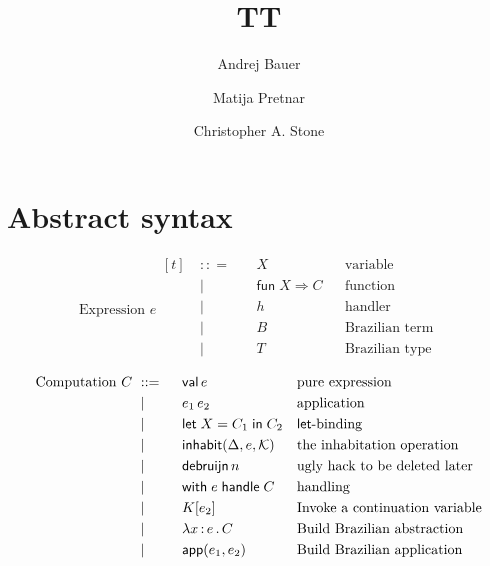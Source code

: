 \documentclass[11pt]{article}
\newcommand{\bnf}{\ \mathrel{{:}{:}{=}}\ }
\newcommand{\bnfor}{\ \mid\ \ }
\newcommand{\x}{x}     %
\newcommand{\C}{C}     %
\newcommand{\K}{K}     %
\newcommand{\X}{X}     %
\newcommand{\e}{e}     %
\newcommand{\rgn}{r}   %
\newcommand{\T}{T}     %
\newcommand{\val}{\mathsf{val}\,} %
\newcommand{\letin}[1]{\mathsf{let}\; #1 \;\mathsf{in}\;} %
\newcommand{\inhabit}[3]{\mathsf{inhabit}(#1, #2, #3)} %
\newcommand{\withhandle}[1]{\mathsf{with}\;#1\;\mathsf{handle}\;} %
\newcommand{\abs}[1]{\mathsf{abs}\;#1\;\mathsf{in}\;} %
\newcommand{\new}[2]{\mathsf{new}(#1,#2)} %
\newcommand{\fun}[1]{\mathsf{fun}\;#1\Rightarrow} %
\newcommand{\app}[2]{#1\,#2} %
\newcommand{\lam}[2]{\lambda #1 \,{:}\, #2 \,.\,} %
\newcommand{\kapp}[2]{#1[#2]} %
\newcommand{\makeApp}[2]{\mathsf{app}(#1,#2)} %
\newcommand{\debruijn}[1]{\mathsf{debruijn}\,#1} %
\newcommand{\cont}{{\cal K}}     %
\newcommand{\D}{\Delta}
\begin{document}
\title{TT}
\author{Andrej Bauer \and Matija Pretnar \and Christopher A. Stone}
\maketitle

\section{Abstract syntax}
\label{sec:abstract-syntax}

\begin{equation*}
  \text{Expression $\e$}
  \begin{aligned}[t]
    &\bnf   {} && \X          && \text{variable} \\
    &\bnfor {} && \fun{\X} \C  && \text{function} \\
    &\bnfor {} && h           && \text{handler} \\
    &\bnfor {} && B           && \text{Brazilian term} \\
    &\bnfor {} && T           && \text{Brazilian type} \\
  \end{aligned}
\end{equation*}
%
\begin{equation*}
  \text{Computation $\C$}
  \begin{aligned}[t]
    &\bnf   {} && \val \e                && \text{pure expression} \\
    &\bnfor {} && \app{\e_1}{\e_2}   && \text{application} \\
    &\bnfor {} && \letin{\X = \C_1} \C_2  && \text{$\mathsf{let}$-binding} \\
    &\bnfor {} && \inhabit{\D}{\e}{\cont} && \text{the inhabitation operation} \\
    &\bnfor {} && \debruijn{n} && \text{ugly hack to be deleted later} \\
    &\bnfor {} && \withhandle{\e} \C && \text{handling} \\
    &\bnfor {} && \kapp{\K}{\e_2}   && \text{Invoke a continuation variable} \\
    &\bnfor {} && \lam{\x}{\e} \C   && \text{Build Brazilian abstraction} \\
    &\bnfor {} && \makeApp{\e_1}{\e_2} && \text{Build Brazilian application} \\
  \end{aligned}
\end{equation*}
\end{document}
